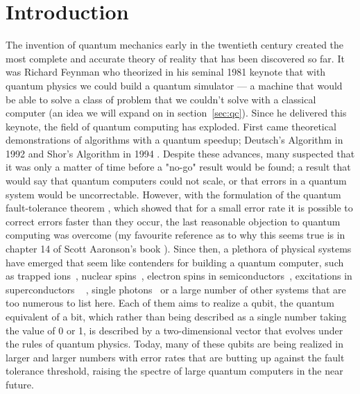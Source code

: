 \chapter{Introduction}

The invention of quantum mechanics early in the twentieth century created the most complete and accurate
theory of reality that has been discovered so far. It was Richard Feynman who theorized in his
seminal 1981 keynote \cite{Feynman1982} that with quantum physics we could build a quantum simulator ---
a machine that would be able to solve a class of problem that we couldn't solve with a
classical computer (an idea we will expand on in section~\ref{sec:qc}). Since he delivered this keynote, the
field of quantum computing has exploded. First came theoretical demonstrations of algorithms
with a quantum speedup; Deutsch's Algorithm in 1992 \cite{Deutsch} and Shor's Algorithm in 1994 \cite{Shor}.
Despite these advances, many suspected that it was only a matter of time before a "no-go" result would
be found; a result that would say that quantum computers could not scale, or that errors in a quantum system would be uncorrectable.
However, with the formulation of the quantum fault-tolerance theorem \cite{1996quant.ph.11025A}, which
showed that for a small error rate it is possible to correct errors faster than they occur, the last
reasonable objection to quantum computing was overcome (my favourite reference as to why this seems true
is in chapter 14 of Scott Aaronson's book \cite{Aaronson:skepticism}). Since then, a plethora of physical
systems have emerged that seem like contenders for building a quantum computer, such as trapped
ions~\cite{doi:10.1063/1.5088164}, nuclear spins~\cite{acs.nanolett.8b00006}, electron spins in
semiconductors~\cite{RevModPhys.79.1217}, excitations in superconductors ~ \cite{Wendin_2017},
single photons~\cite{OBrien1567} or a large number of other systems that are too numerous to list here.
Each of them aims to realize a qubit, the quantum equivalent of a bit, which rather than being described as a
single number taking the value of 0 or 1, is described by a two-dimensional vector that evolves under the rules
of quantum physics. Today, many of these qubits are being realized in larger and larger numbers with error rates
that are butting up against the fault tolerance threshold, raising the spectre of large quantum computers
in the near future.

